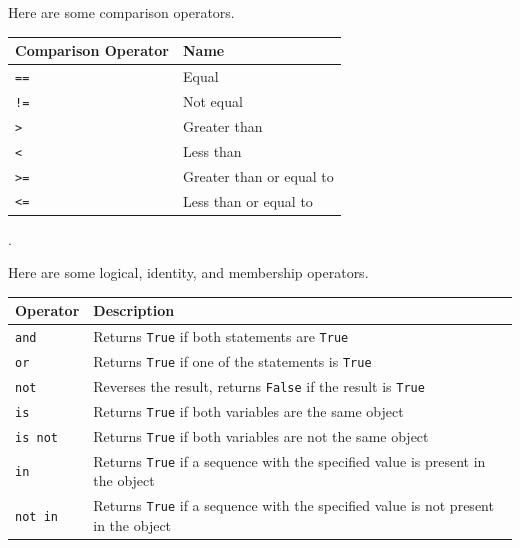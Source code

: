 \documentclass[11pt]{scrartcl}
\theoremstyle{definition}
\begin{document}
Here are some comparison operators.

\begin{center}
\begin{tabular}{|l|l|} \hline
    \textbf{Comparison Operator} & \textbf{Name} \\ \hline
    \texttt{==} & Equal \\ \hline
    \texttt{!=} & Not equal \\ \hline
    \texttt{>} & Greater than \\ \hline
    \texttt{<} & Less than \\ \hline
    \texttt{>=} & Greater than or equal to \\ \hline
    \texttt{<=} & Less than or equal to \\ \hline
\end{tabular}
\end{center}.

Here are some logical, identity, and membership operators. \vspace{-0.5\baselineskip} %
\begin{center}
\begin{tabular}{|l|l|} \hline
    \textbf{Operator} & \textbf{Description} \\ \hline
    \texttt{and} & Returns \texttt{True} if both statements are 
    \texttt{True} \\ \hline
    \texttt{or} & Returns \texttt{True} if one of the statements is 
    \texttt{True} \\ \hline
    \texttt{not} & Reverses the result, returns \texttt{False} if the result is 
    \texttt{True} \\ \hline
    \texttt{is} & Returns \texttt{True} if both variables are the same object \\ \hline
    \texttt{is not} & Returns \texttt{True} if both variables are not the same 
    object \\ \hline
    \texttt{in} & Returns \texttt{True} if a sequence with the specified value is present 
    in the object \\ \hline
    \texttt{not in} & Returns \texttt{True} if a sequence with the specified value is not 
    present in the object \\ \hline
\end{tabular}
\end{center}
\end{document}
